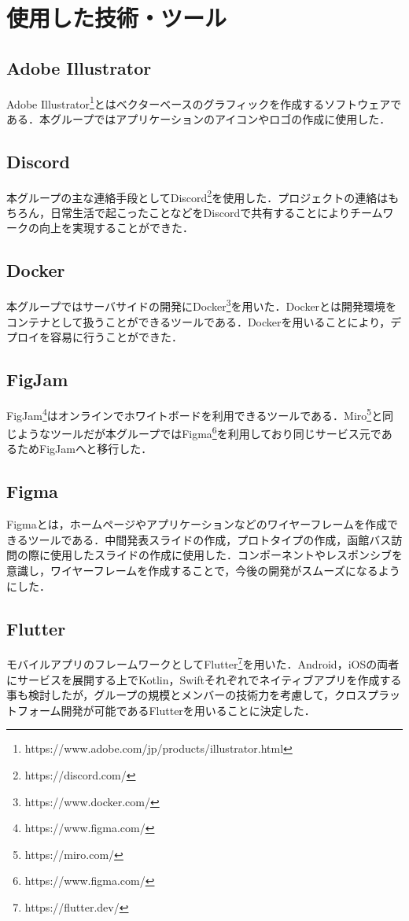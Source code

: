 \chapter{使用した技術・ツール}

\section{Adobe Illustrator}
Adobe Illustrator\footnote{https://www.adobe.com/jp/products/illustrator.html}とはベクターベースのグラフィックを作成するソフトウェアである．本グループではアプリケーションのアイコンやロゴの作成に使用した．

\section{Discord}
本グループの主な連絡手段としてDiscord\footnote{https://discord.com/}を使用した．プロジェクトの連絡はもちろん，日常生活で起こったことなどをDiscordで共有することによりチームワークの向上を実現することができた．

\section{Docker}
本グループではサーバサイドの開発にDocker\footnote{https://www.docker.com/}を用いた．Dockerとは開発環境をコンテナとして扱うことができるツールである．Dockerを用いることにより，デプロイを容易に行うことができた．

\section{FigJam}
FigJam\footnote{https://www.figma.com/}はオンラインでホワイトボードを利用できるツールである．Miro\footnote{https://miro.com/}と同じようなツールだが本グループではFigma\footnote{https://www.figma.com/}を利用しており同じサービス元であるためFigJamへと移行した．

\section{Figma}
Figmaとは，ホームページやアプリケーションなどのワイヤーフレームを作成できるツールである．中間発表スライドの作成，プロトタイプの作成，函館バス訪問の際に使用したスライドの作成に使用した．コンポーネントやレスポンシブを意識し，ワイヤーフレームを作成することで，今後の開発がスムーズになるようにした．

\section{Flutter}
モバイルアプリのフレームワークとしてFlutter\footnote{https://flutter.dev/}を用いた．Android，iOSの両者にサービスを展開する上でKotlin，Swiftそれぞれでネイティブアプリを作成する事も検討したが，グループの規模とメンバーの技術力を考慮して，クロスプラットフォーム開発が可能であるFlutterを用いることに決定した．

